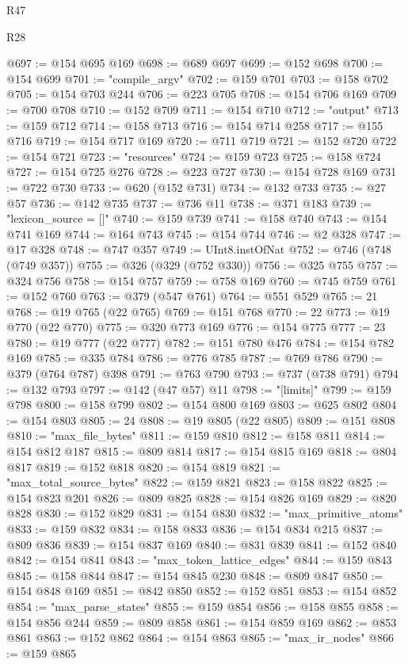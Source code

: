 \begin{lexlean}{R47}
\begin{lexlean}{R28}
\begin{coremodule}
{{{{{{{{{{{{{{{{{{{{{{{{{{{{{{{{{{{{{{{{{{{{{{{{{{{{{{{{{{{{{{{{{{{{{{{{{{{{{{{{{{{{{{{{{{{{{{{{{{{{{{{{{{{{{{{{{{{{{{{{{{{{{{{{{{{{{@697 := @154 @695 @169
@698 := @689 @697
@699 := @152 @698
@700 := @154 @699
@701 := "compile_argv"
@702 := @159 @701
@703 := @158 @702
@705 := @154 @703 @244
@706 := @223 @705
@708 := @154 @706 @169
@709 := @700 @708
@710 := @152 @709
@711 := @154 @710
@712 := "output"
@713 := @159 @712
@714 := @158 @713
@716 := @154 @714 @258
@717 := @155 @716
@719 := @154 @717 @169
@720 := @711 @719
@721 := @152 @720
@722 := @154 @721
@723 := "resources"
@724 := @159 @723
@725 := @158 @724
@727 := @154 @725 @276
@728 := @223 @727
@730 := @154 @728 @169
@731 := @722 @730
@733 := @620 (@152 @731)
@734 := @132 @733
@735 := @27 @57
@736 := @142 @735
@737 := @736 @11
@738 := @371 @183
@739 := "lexicon_source = []"
@740 := @159 @739
@741 := @158 @740
@743 := @154 @741 @169
@744 := @164 @743
@745 := @154 @744
@746 := @2 @328
@747 := @17 @328
@748 := @747 @357
@749 := UInt8.instOfNat
@752 := @746 (@748 (@749 @357))
@755 := @326 (@329 (@752 @330))
@756 := @325 @755
@757 := @324 @756
@758 := @154 @757
@759 := @758 @169
@760 := @745 @759
@761 := @152 @760
@763 := @379 (@547 @761)
@764 := @551 @529
@765 := 21
@768 := @19 @765 (@22 @765)
@769 := @151 @768
@770 := 22
@773 := @19 @770 (@22 @770)
@775 := @320 @773 @169
@776 := @154 @775
@777 := 23
@780 := @19 @777 (@22 @777)
@782 := @151 @780 @476
@784 := @154 @782 @169
@785 := @335 @784
@786 := @776 @785
@787 := @769 @786
@790 := @379 (@764 @787) @398
@791 := @763 @790
@793 := @737 (@738 @791)
@794 := @132 @793
@797 := @142 (@47 @57) @11
@798 := "[limits]"
@799 := @159 @798
@800 := @158 @799
@802 := @154 @800 @169
@803 := @625 @802
@804 := @154 @803
@805 := 24
@808 := @19 @805 (@22 @805)
@809 := @151 @808
@810 := "max_file_bytes"
@811 := @159 @810
@812 := @158 @811
@814 := @154 @812 @187
@815 := @809 @814
@817 := @154 @815 @169
@818 := @804 @817
@819 := @152 @818
@820 := @154 @819
@821 := "max_total_source_bytes"
@822 := @159 @821
@823 := @158 @822
@825 := @154 @823 @201
@826 := @809 @825
@828 := @154 @826 @169
@829 := @820 @828
@830 := @152 @829
@831 := @154 @830
@832 := "max_primitive_atoms"
@833 := @159 @832
@834 := @158 @833
@836 := @154 @834 @215
@837 := @809 @836
@839 := @154 @837 @169
@840 := @831 @839
@841 := @152 @840
@842 := @154 @841
@843 := "max_token_lattice_edges"
@844 := @159 @843
@845 := @158 @844
@847 := @154 @845 @230
@848 := @809 @847
@850 := @154 @848 @169
@851 := @842 @850
@852 := @152 @851
@853 := @154 @852
@854 := "max_parse_states"
@855 := @159 @854
@856 := @158 @855
@858 := @154 @856 @244
@859 := @809 @858
@861 := @154 @859 @169
@862 := @853 @861
@863 := @152 @862
@864 := @154 @863
@865 := "max_ir_nodes"
@866 := @159 @865
}}}}}}}}}}}}}}}}}}}}}}}}}}}}}}}}}}}}}}}}}}}}}}}}}}}}}}}}}}}}}}}}}}}}}}}}}}}}}}}}}}}}}}}}}}}}}}}}}}}}}}}}}}}}}}}}}}}}}}}}}}}}}}}}}}}}}
\end{coremodule}
\end{lexlean}
\end{lexlean}
